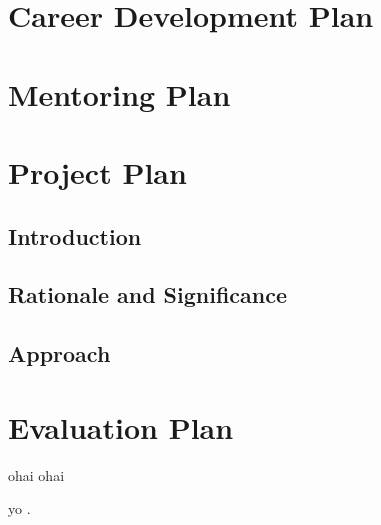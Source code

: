\documentclass[12pt,letterpaper]{article}
\title{\ruleline{Project Narrative}}
\begin{document}
\maketitle

\section{Career Development Plan}
\lipsum[1-2]

\section{Mentoring Plan}
\lipsum[2-3]


\section{Project Plan}

\subsection{Introduction}
\lipsum[3]

\subsection{Rationale and Significance}
\lipsum[3]

\subsection{Approach}
\lipsum[3]


\section{Evaluation Plan}
\lipsum[4-5]

ohai \citep{lehner2017independently} ohai \citep{clarkson2017population}

yo \citep{clarkson2017population}.

\newpage
\AtBeginShipout{%
\AtBeginShipoutDiscard
}

\printbibliography
\end{document}
